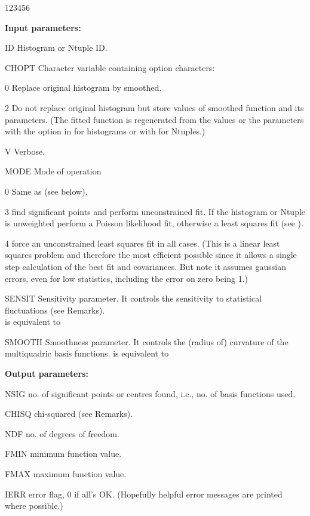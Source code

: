 \begin{DLtt}{123456}
\item[{\rm\bf Input parameters:}]
\item[ID]      Histogram or Ntuple ID.
\item[CHOPT]   Character variable containing option characters:
         \begin{DLtt}{1}
         \item[0] Replace original histogram by smoothed.
         \item[2] Do not replace original histogram but store values of smoothed
                  function and its parameters.  (The fitted function is regenerated
                  from the values or the parameters with the  option in
                   for histograms or with  for Ntuples.)
         \item[V] Verbose.
         \end{DLtt}
\item[MODE]    Mode of operation
         \begin{DLtt}{1}
         \item[0] Same as  (see below).
         \item[3] find significant points and perform unconstrained fit.  If
                  the histogram or Ntuple is unweighted perform a Poisson likelihood
                  fit, otherwise a least squares fit (see ).
         \item[4] force an unconstrained least squares fit in all cases.
                  (This is a linear least squares problem and therefore the most
                  efficient possible since it allows a single step calculation of the
                  best fit and covariances.  But note it assumes gaussian errors,
                  even for low statistics, including the error on zero being 1.)
         \end{DLtt}
\item[SENSIT]  Sensitivity parameter.  
               It controls the sensitivity to statistical fluctuations
               (see Remarks).\\
                is equivalent to 
\item[SMOOTH]  Smoothness parameter.  
               It controls the (radius of) curvature of the multiquadric basis functions.
                is equivalent to 
\item[{\rm\bf Output parameters:}]
\item[NSIG]    no. of significant points or centres found, i.e., no. of basis
               functions used.
\item[CHISQ]   chi-squared (see Remarks).
\item[NDF]     no. of degrees of freedom.
\item[FMIN]    minimum function value.
\item[FMAX]    maximum function value.
\item[IERR]    error flag, 0 if all's OK.  (Hopefully helpful error messages are
               printed where possible.)
\end{DLtt}

